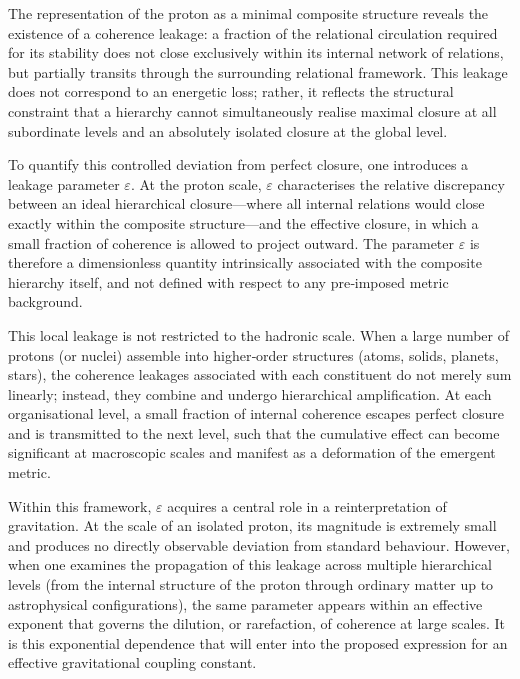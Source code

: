 \documentclass[11pt,a4paper]{article}
\begin{document}
The representation of the proton as a minimal composite structure reveals the existence of a coherence leakage: a fraction of the relational circulation required for its stability does not close exclusively within its internal network of relations, but partially transits through the surrounding relational framework. This leakage does not correspond to an energetic loss; rather, it reflects the structural constraint that a hierarchy cannot simultaneously realise maximal closure at all subordinate levels and an absolutely isolated closure at the global level.

To quantify this controlled deviation from perfect closure, one introduces a leakage parameter \(\varepsilon\). At the proton scale, \(\varepsilon\) characterises the relative discrepancy between an ideal hierarchical closure—where all internal relations would close exactly within the composite structure—and the effective closure, in which a small fraction of coherence is allowed to project outward. The parameter \(\varepsilon\) is therefore a dimensionless quantity intrinsically associated with the composite hierarchy itself, and not defined with respect to any pre‑imposed metric background.

This local leakage is not restricted to the hadronic scale. When a large number of protons (or nuclei) assemble into higher‑order structures (atoms, solids, planets, stars), the coherence leakages associated with each constituent do not merely sum linearly; instead, they combine and undergo hierarchical amplification. At each organisational level, a small fraction of internal coherence escapes perfect closure and is transmitted to the next level, such that the cumulative effect can become significant at macroscopic scales and manifest as a deformation of the emergent metric.

Within this framework, \(\varepsilon\) acquires a central role in a reinterpretation of gravitation. At the scale of an isolated proton, its magnitude is extremely small and produces no directly observable deviation from standard behaviour. However, when one examines the propagation of this leakage across multiple hierarchical levels (from the internal structure of the proton through ordinary matter up to astrophysical configurations), the same parameter appears within an effective exponent that governs the dilution, or rarefaction, of coherence at large scales. It is this exponential dependence that will enter into the proposed expression for an effective gravitational coupling constant.
\end{document}
